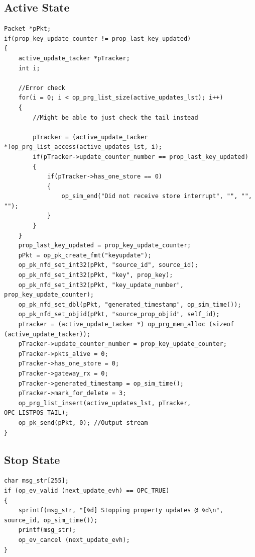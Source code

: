 \subsection{Active State}
{\tiny
\begin{verbatim}
Packet *pPkt;
if(prop_key_update_counter != prop_last_key_updated)
{
	active_update_tacker *pTracker;
	int i;
	
	//Error check
	for(i = 0; i < op_prg_list_size(active_updates_lst); i++)
	{
		//Might be able to just check the tail instead
	
		pTracker = (active_update_tacker *)op_prg_list_access(active_updates_lst, i);
		if(pTracker->update_counter_number == prop_last_key_updated)
		{
			if(pTracker->has_one_store == 0)
			{
				op_sim_end("Did not receive store interrupt", "", "", "");
			}
		}
	}
	prop_last_key_updated = prop_key_update_counter;
	pPkt = op_pk_create_fmt("keyupdate");
	op_pk_nfd_set_int32(pPkt, "source_id", source_id);		
	op_pk_nfd_set_int32(pPkt, "key", prop_key);	
	op_pk_nfd_set_int32(pPkt, "key_update_number", prop_key_update_counter);
	op_pk_nfd_set_dbl(pPkt, "generated_timestamp", op_sim_time());
	op_pk_nfd_set_objid(pPkt, "source_prop_objid", self_id);
	pTracker = (active_update_tacker *) op_prg_mem_alloc (sizeof (active_update_tacker));
	pTracker->update_counter_number = prop_key_update_counter;
	pTracker->pkts_alive = 0;
	pTracker->has_one_store = 0;
	pTracker->gateway_rx = 0;
	pTracker->generated_timestamp = op_sim_time();
	pTracker->mark_for_delete = 3;
	op_prg_list_insert(active_updates_lst, pTracker, OPC_LISTPOS_TAIL);	
	op_pk_send(pPkt, 0); //Output stream
}
\end{verbatim}
}

\subsection{Stop State}
{\tiny
\begin{verbatim}
char msg_str[255];
if (op_ev_valid (next_update_evh) == OPC_TRUE)
{
	sprintf(msg_str, "[%d] Stopping property updates @ %d\n", source_id, op_sim_time());
	printf(msg_str);
	op_ev_cancel (next_update_evh);
}
\end{verbatim}
}